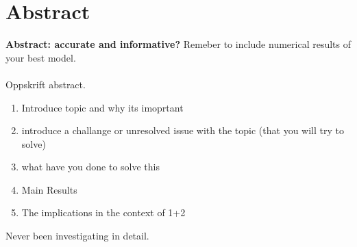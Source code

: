 \chapter*{Abstract}
\textbf{Abstract: accurate and informative?}
Remeber to include numerical results of your best model. 
\\ \\ 

Oppskrift abstract.
\begin{enumerate}
    \item Introduce topic and why its imoprtant
    \item introduce a challange or unresolved issue with the topic (that you will try to solve)
    \item what have you done to solve this
    \item Main Results
    \item The implications in the context of 1+2
\end{enumerate}

Never been investigating in detail. 

\cleardoublepage
